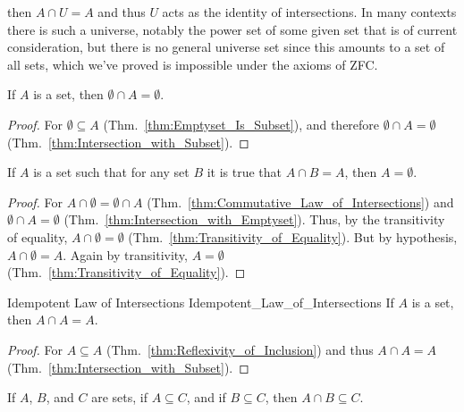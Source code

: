         then $A\cap{U}=A$ and thus $U$ acts as the identity of intersections. In
        many contexts there is such a universe, notably the power set of some
        given set that is of current consideration, but there is no general
        universe set since this amounts to a set of all sets, which we've proved
        is impossible under the axioms of ZFC.
        \begin{theorem}
            \label{thm:Intersection_with_Emptyset}%
            If $A$ is a set, then $\emptyset\cap{A}=\emptyset$.
        \end{theorem}
        \begin{proof}
            For $\emptyset\subseteq{A}$ (Thm.~\ref{thm:Emptyset_Is_Subset}), and
            therefore $\emptyset\cap{A}=\emptyset$
            (Thm.~\ref{thm:Intersection_with_Subset}).
        \end{proof}
        \begin{theorem}
            \label{thm:Empty_Set_Is_Zero_for_Intersections}%
            If $A$ is a set such that for any set $B$ it is true that
            $A\cap{B}=A$, then $A=\emptyset$.
        \end{theorem}
        \begin{proof}
            For $A\cap\emptyset=\emptyset\cap{A}$
            (Thm.~\ref{thm:Commutative_Law_of_Intersections}) and
            $\emptyset\cap{A}=\emptyset$
            (Thm.~\ref{thm:Intersection_with_Emptyset}). Thus, by the
            transitivity of equality, $A\cap\emptyset=\emptyset$
            (Thm.~\ref{thm:Transitivity_of_Equality}). But by hypothesis,
            $A\cap\emptyset=A$. Again by transitivity, $A=\emptyset$
            (Thm.~\ref{thm:Transitivity_of_Equality}).
        \end{proof}
        \begin{ltheorem}{Idempotent Law of Intersections}
                        {Idempotent_Law_of_Intersections}
            If $A$ is a set, then $A\cap{A}=A$.
        \end{ltheorem}
        \begin{proof}
            For $A\subseteq{A}$ (Thm.~\ref{thm:Reflexivity_of_Inclusion}) and
            thus $A\cap{A}=A$ (Thm.~\ref{thm:Intersection_with_Subset}).
        \end{proof}
        \begin{theorem}
            \label{thm:Intersection_of_Subsets_is_Still_Subset}%
            If $A$, $B$, and $C$ are sets, if $A\subseteq{C}$, and if
            $B\subseteq{C}$, then $A\cap{B}\subseteq{C}$.
        \end{theorem}
